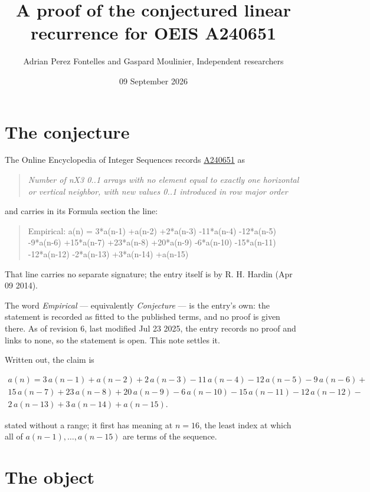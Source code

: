 \documentclass[11pt]{article}
\title{A proof of the conjectured linear recurrence for OEIS A240651}
\author{Adrian Perez Fontelles and Gaspard Moulinier, Independent researchers}
\date{09 September 2026}
\theoremstyle{definition}
\begin{document}
\maketitle
\section{The conjecture}

The Online Encyclopedia of Integer Sequences records \href{https://oeis.org/A240651}{A240651} as

\begin{quote}\itshape Number of nX3 0..1 arrays with no element equal to exactly one horizontal or vertical neighbor, with new values 0..1 introduced in row major order\end{quote}

and carries in its Formula section the line:

\begin{quote}\ttfamily Empirical: a(n) = 3*a(n-1) +a(n-2) +2*a(n-3) -11*a(n-4) -12*a(n-5) -9*a(n-6) +15*a(n-7) +23*a(n-8) +20*a(n-9) -6*a(n-10) -15*a(n-11) -12*a(n-12) -2*a(n-13) +3*a(n-14) +a(n-15)\end{quote}

That line carries no separate signature; the entry itself is by R. H. Hardin (Apr 09 2014).

The word {\itshape Empirical} --- equivalently {\itshape Conjecture} --- is the entry's own: the statement is recorded as fitted to the published terms, and no proof is given there. As of revision 6, last modified Jul 23 2025, the entry records no proof and links to none, so the statement is open. This note settles it.

Written out, the claim is

\begin{multline*} a(n) = 3\,a(n-1) + a(n-2) + 2\,a(n-3) - 11\,a(n-4) - 12\,a(n-5) - 9\,a(n-6) + \\ 15\,a(n-7) + 23\,a(n-8) + 20\,a(n-9) - 6\,a(n-10) - 15\,a(n-11) - 12\,a(n-12) - \\ 2\,a(n-13) + 3\,a(n-14) + a(n-15). \end{multline*}

stated without a range; it first has meaning at $n = 16$, the least index at which all of $a(n-1),\dots,a(n-15)$ are terms of the sequence.

\section{The object}
\end{document}

